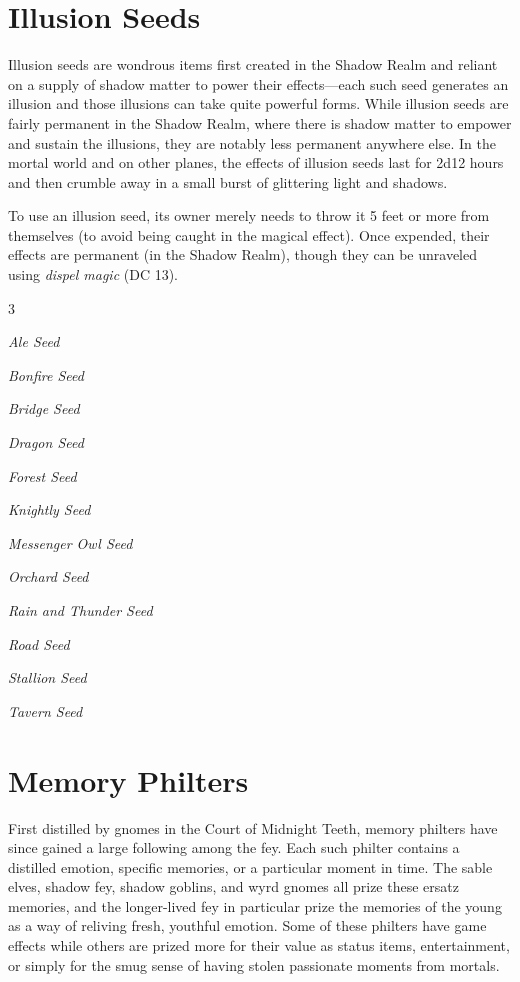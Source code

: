 \documentclass[10pt,a4paper,twoside,bg=print,twocolumn,openany,nodeprecatedcode]{dndbook}
\begin{document}
\section{Illusion Seeds}
Illusion seeds are wondrous items first created in the Shadow Realm and reliant on a supply of shadow matter to power their effects—each such seed generates an illusion and those illusions can take quite powerful forms. While illusion seeds are fairly permanent in the Shadow Realm, where there is shadow matter to empower and sustain the illusions, they are notably less permanent anywhere else. In the mortal world and on other planes, the effects of illusion seeds last for 2d12 hours and then crumble away in a small burst of glittering light and shadows.

To use an illusion seed, its owner merely needs to throw it 5 feet or more from themselves (to avoid being caught in the magical effect). Once expended, their effects are permanent (in the Shadow Realm), though they can be unraveled using \textit{dispel magic} (DC 13).


\begin{itemize}
\begin{multicols}{3}
\item \textit{Ale Seed}
\item \textit{Bonfire Seed}
\item \textit{Bridge Seed}
\item \textit{Dragon Seed}
\item \textit{Forest Seed}
\item \textit{Knightly Seed}
\item \textit{Messenger Owl Seed}
\item \textit{Orchard Seed}
\item \textit{Rain and Thunder Seed}
\item \textit{Road Seed}
\item \textit{Stallion Seed}
\item \textit{Tavern Seed}
\end{multicols}

\end{itemize}

\section{Memory Philters}
First distilled by gnomes in the Court of Midnight Teeth, memory philters have since gained a large following among the fey. Each such philter contains a distilled emotion, specific memories, or a particular moment in time. The sable elves, shadow fey, shadow goblins, and wyrd gnomes all prize these ersatz memories, and the longer-lived fey in particular prize the memories of the young as a way of reliving fresh, youthful emotion. Some of these philters have game effects while others are prized more for their value as status items, entertainment, or simply for the smug sense of having stolen passionate moments from mortals.
\end{document}
